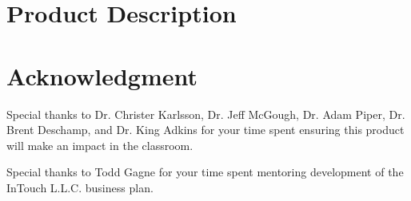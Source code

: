 \documentclass{book}
\begin{document}
\appendix

\chapter{Product Description}







% 

\chapter{Acknowledgment}
\label{SpecialThanks}  
Special thanks to Dr. Christer Karlsson, Dr. Jeff McGough, Dr. Adam Piper, Dr. Brent Deschamp, and Dr. King Adkins for your time spent ensuring this product will make an impact in the classroom. 
\vspace{\baselineskip}

Special thanks to Todd Gagne for your time spent mentoring development of the InTouch L.L.C. business plan. 




\backmatter

%

%
\end{document}
